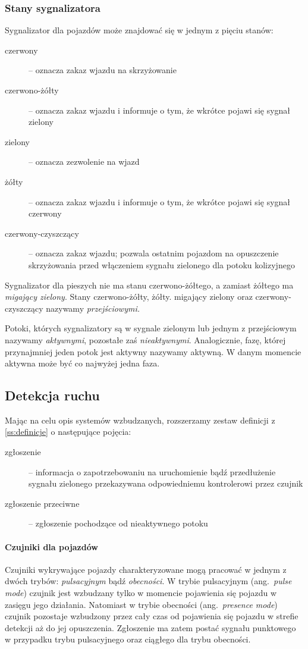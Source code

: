 \documentclass{pracamgr}
\newcommand{\ang}[1]{(ang.~\emph{#1})}
\begin{document}
\subsubsection{Stany sygnalizatora}
Sygnalizator dla pojazdów może znajdować się w jednym z pięciu stanów:
\begin{description}
  \item[czerwony] -- oznacza zakaz wjazdu na skrzyżowanie
  \item[czerwono-żółty] -- oznacza zakaz wjazdu i informuje o tym, że
  wkrótce pojawi się sygnał zielony
  \item[zielony] -- oznacza zezwolenie na wjazd
  \item[żółty]  -- oznacza zakaz wjazdu i informuje o tym, że wkrótce
  pojawi się sygnał czerwony
  \item[czerwony-czyszczący] -- oznacza zakaz wjazdu; pozwala ostatnim
  pojazdom na opuszczenie skrzyżowania przed włączeniem sygnału
  zielonego dla potoku kolizyjnego
\end{description}

Sygnalizator dla pieszych nie ma stanu czerwono-żółtego, a zamiast
żółtego ma \emph{migający zielony}. Stany czerwono-żółty,
żółty. migający zielony oraz czerwony-czyszczący nazywamy
\emph{przejściowymi.}

Potoki, których sygnalizatory są w sygnale zielonym lub jednym z
przejściowym nazywamy \emph{aktywnymi}, pozostałe zaś
\emph{nieaktywnymi}. Analogicznie, fazę, której przynajmniej jeden
potok jest aktywny nazywamy aktywną. W danym momencie aktywna może być
co najwyżej jedna faza.

\subsection{Detekcja ruchu}
\label{ss:detekcja}
Mając na celu opis systemów wzbudzanych, rozszerzamy zestaw
definicji z \ref{ss:definicje} o następujące pojęcia:
\begin{description}
  \item[zgłoszenie] -- informacja o zapotrzebowaniu na uruchomienie
  bądź przedłużenie sygnału zielonego przekazywana odpowiedniemu
  kontrolerowi przez czujnik
  \item[zgłoszenie przeciwne] -- zgłoszenie pochodzące od
  nieaktywnego potoku
\end{description}

\paragraph{Czujniki dla pojazdów} Czujniki wykrywające pojazdy
charakteryzowane mogą pracować w jednym z dwóch trybów:
\emph{pulsacyjnym} bądź \emph{obecności}.  W trybie pulsacyjnym
\ang{pulse mode} czujnik jest wzbudzany tylko w momencie pojawienia
się pojazdu w zasięgu jego działania.  Natomiast w trybie obecności
\ang{presence mode} czujnik pozostaje wzbudzony przez cały czas od
pojawienia się pojazdu w strefie detekcji aż do jej
opuszczenia. Zgłoszenie ma zatem postać sygnału punktowego w przypadku
trybu pulsacyjnego oraz ciągłego dla trybu obecności.
\end{document}
